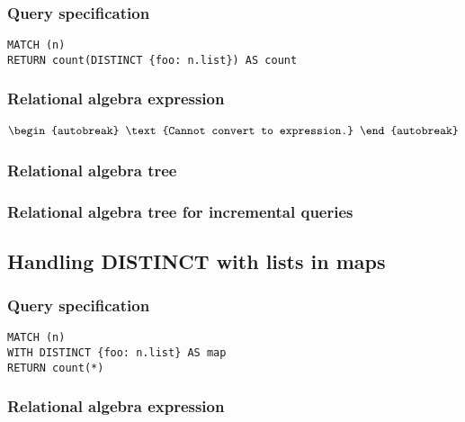 \subsubsection*{Query specification}

\begin{lstlisting}
MATCH (n)
RETURN count(DISTINCT {foo: n.list}) AS count
\end{lstlisting}

\subsubsection*{Relational algebra expression}

\begin{align*}
\begin{autobreak}
\text{Cannot convert to expression.}
\end{autobreak}
\end{align*}

\subsubsection*{Relational algebra tree}


\subsubsection*{Relational algebra tree for incremental queries}


\subsection{Handling DISTINCT with lists in maps}

\subsubsection*{Query specification}

\begin{lstlisting}
MATCH (n)
WITH DISTINCT {foo: n.list} AS map
RETURN count(*)
\end{lstlisting}

\subsubsection*{Relational algebra expression}

